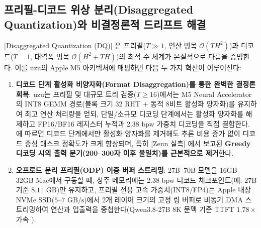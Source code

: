 \documentclass[10pt,a4paper]{article}
\begin{document}
\subsection{프리필-디코드 위상 분리(Disaggregated Quantization)와 비결정론적 드리프트 해결}
[Disaggregated Quantization (DQ)] \cite{panferov2026dq}은 프리필($T \gg 1$, 연산 병목 $\mathcal{O}(TH^2)$)과 디코드($T = 1$, 대역폭 병목 $\mathcal{O}(H^2 + TH)$)의 최적 수 체계가 본질적으로 다름을 증명한다. 이를 \textsf{uzu}의 Apple M5 아키텍처에 매핑하면 다음 두 가지 혁신이 이루어진다:
\begin{enumerate}\setlength{\itemsep}{2pt}\setlength{\parskip}{0pt}
  \item \textbf{디코드 단계 활성화 비양자화(Format Disaggregation)를 통한 완벽한 결정론 회복}: \textsf{uzu}는 프리필 및 대규모 트리 검증($T \ge 16$)에서는 M5 Neural Accelerator의 INT8 GEMM 경로(블록 크기 32 RHT + 동적 8비트 활성화 양자화)를 유지하여 최고 연산 처리량을 얻되, 단일/소규모 디코딩 단계에서는 활성화 양자화를 해제하고 FP16/BF16 레지스터 누적과 2.38 bpw 가중치 디코딩을 직접 결합한다. \cite{panferov2026dq}에 따르면 디코드 단계에서만 활성화 양자화를 제거해도 추론 비용 증가 없이 디코드 중심 태스크 정확도가 크게 향상되며, 특히 [Zenn 실측] \cite{zenn2026uzu}에서 보고된 \textbf{Greedy 디코딩 시의 출력 분기(200--300자 이후 불일치)를 근본적으로 제거}한다.
  \item \textbf{오프로드 분리 프리필(ODP) 이중 버퍼 스트리밍}: 27B--70B 모델을 16GB--32GB Mac에서 구동할 때, 상주 메모리에는 2.38 bpw 디코드 체크포인트(예: 27B 기준 $8.11\text{ GB}$)만 유지하고, 프리필 전용 고속 가중치(INT8/FP4)는 Apple 내장 NVMe SSD($5\text{--}7\text{ GB/s}$)에서 2개 레이어 크기의 고정 링 버퍼로 비동기 DMA 스트리밍하여 연산과 입출력을 중첩한다(\textsf{Qwen3.8-27B} 8K 문맥 기준 TTFT $1.78\times$ 가속 \cite{panferov2026dq}).
\end{enumerate}
\end{document}
